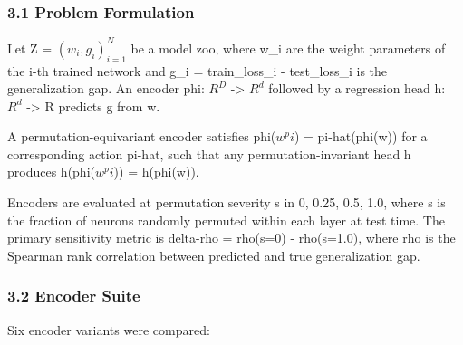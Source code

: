 
\subsubsection{3.1 Problem Formulation}

Let Z = ${(w_i, g_i)}_{i=1}^N$ be a model zoo, where w\_i are the weight parameters of the i-th trained network and g\_i = train\_loss\_i - test\_loss\_i is the generalization gap. An encoder phi: $R^D$ -> $R^d$ followed by a regression head h: $R^d$ -> R predicts g from w.

A permutation-equivariant encoder satisfies phi($w^pi$) = pi-hat(phi(w)) for a corresponding action pi-hat, such that any permutation-invariant head h produces h(phi($w^pi$)) = h(phi(w)).

Encoders are evaluated at permutation severity s in {0, 0.25, 0.5, 1.0}, where s is the fraction of neurons randomly permuted within each layer at test time. The primary sensitivity metric is delta-rho = rho(s=0) - rho(s=1.0), where rho is the Spearman rank correlation between predicted and true generalization gap.

\subsubsection{3.2 Encoder Suite}

Six encoder variants were compared:

\begin{table}[htbp]
\centering
{}
\end{table}

